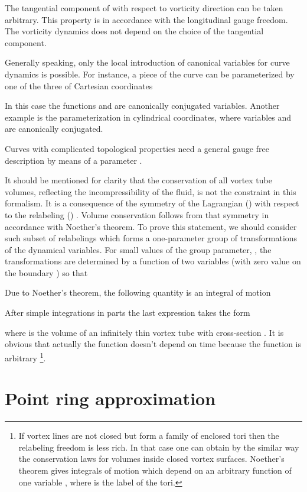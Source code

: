 The tangential component of  with respect to vorticity direction 
can be taken arbitrary. 
This property is in accordance with the longitudinal gauge 
freedom. The vorticity dynamics does not depend on the choice of the 
tangential component. 

Generally speaking, only the local introduction of canonical variables for curve 
dynamics is possible. For instance, a piece of the curve 
can be parameterized by one of the three of Cartesian coordinates

In this case the functions  and  are canonically conjugated
variables. Another example is the parameterization in cylindrical coordinates,
where variables  and  are canonically conjugated.

Curves with complicated topological properties need a general
gauge free description by means of a parameter .

It should be mentioned for clarity that the conservation of all 
vortex tube volumes, reflecting the incompressibility of the fluid, 
is not the constraint in this formalism. 
It is a consequence of the symmetry of the Lagrangian () with
respect to the relabeling ()   . 
Volume conservation follows from that
symmetry in accordance with Noether's theorem.
To prove this statement, we should consider such subset of relabelings
which forms a one-parameter group of transformations of the dynamical variables. 
For small values of the group parameter, , the transformations are 
determined by a function of two variables  
(with zero value on the boundary ) so that

Due to Noether's theorem, the following quantity is an integral of motion


After simple integrations in parts the last expression takes the form

where  is the volume of an infinitely thin vortex 
tube with cross-section . It is obvious that actually the function
 doesn't depend on time  because the function  
is arbitrary
\footnote{
If vortex lines are not closed but form a family of enclosed tori 
then the relabeling freedom is less rich. 
In that case one can obtain by the similar way the conservation laws 
for volumes inside closed vortex surfaces. Noether's theorem gives 
integrals of motion which depend on an arbitrary function of one variable 
, where  is the label of the tori.
}.



\section{Point ring approximation}

